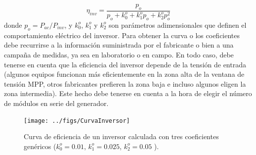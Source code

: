 \begin{equation}
  \eta_{inv}=\frac{p_{o}}{p_{o}+k_{0}^{o}+k_{1}^{o}p_{o}+k_{2}^{o}p_{o}^{2}}\end{equation}
donde $p_{o}=P_{ac}/P_{inv}$,
y $k_{0}^{o}$, $k_{1}^{o}$ y $k_{2}^{o}$
son parámetros adimensionales que definen el comportamiento eléctrico
del inversor. Para obtener la curva o los coeficientes debe recurrirse
a la información suministrada por el fabricante o bien a una campaña
de medidas, ya sea en laboratorio o en campo. En todo caso, debe tenerse
en cuenta que la eficiencia del inversor depende de la tensión de
entrada \cite{Baumgartner.Schmidt.ea2007} (algunos equipos funcionan más eficientemente en la zona alta
de la ventana de tensión MPP, otros fabricantes prefieren la zona
baja e incluso algunos eligen la zona intermedia). Este hecho debe
tenerse en cuenta a la hora de elegir el número de módulos en serie
del generador.

%
\begin{figure}
\begin{centering}
\texttt{[image: ../figs/CurvaInversor]}
\end{centering}

\caption[Curva de eficiencia de un inversor.]{Curva de eficiencia de un inversor calculada con tres coeficientes
genéricos ($k_{0}^{o}=0.01$, $k_{1}^{o}=0.025$, $k_{2}^{o}=0.05$
). \label{fig:Curva-de-eficiencia}}

\end{figure}


